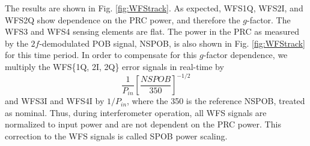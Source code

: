 The results are shown in Fig. \ref{fig:WFStrack}. As expected, WFS1Q,
WFS2I, and WFS2Q show dependence on the PRC power, and therefore the
$g$-factor. The WFS3 and WFS4 sensing elements are flat. The power in
the PRC as measured by the $2f$-demodulated POB signal, NSPOB,
is also shown in Fig. \ref{fig:WFStrack} for this time period. In
order to compensate for this $g$-factor dependence, we multiply the
WFS\{1Q, 2I, 2Q\} error signals in real-time by
\begin{equation}
\frac{1}{P_{in}} \left[\frac{NSPOB}{350}\right]^{-1/2}
\end{equation}
and WFS3I and WFS4I by $1/P_{in}$, where the 350 is the reference
NSPOB, treated as nominal. Thus, during interferometer operation, all
WFS signals are normalized to input power and are not dependent on the
PRC power. This correction to the WFS signals is called SPOB power
scaling.



